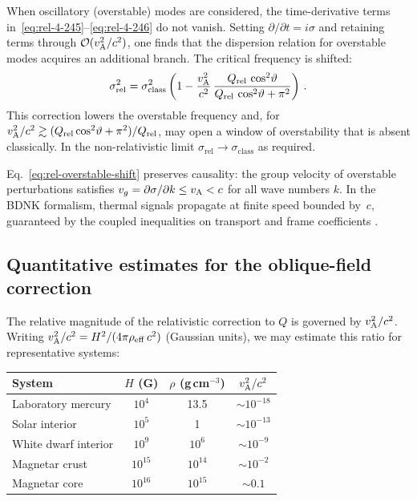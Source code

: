 When oscillatory (overstable) modes are considered, the time-derivative
terms in~\eqref{eq:rel-4-245}--\eqref{eq:rel-4-246} do not vanish.
Setting $\partial/\partial t = i\sigma$ and retaining terms through
$\mathcal{O}(v_{\mathrm{A}}^{2}/c^{2})$, one finds that the dispersion relation for
overstable modes acquires an additional branch.  The critical frequency
is shifted:
\begin{equation}
  \sigma_{\mathrm{rel}}^{2}
  = \sigma_{\mathrm{class}}^{2}
    \left(1 - \frac{v_{\mathrm{A}}^{2}}{c^{2}}\,
              \frac{Q_{\mathrm{rel}}\,\cos^{2}\!\vartheta}
                   {Q_{\mathrm{rel}}\,\cos^{2}\!\vartheta + \pi^{2}}\right)\,.
  \label{eq:rel-overstable-shift}
\end{equation}
This correction lowers the overstable frequency and, for
$v_{\mathrm{A}}^{2}/c^{2} \gtrsim (Q_{\mathrm{rel}}\cos^{2}\!\vartheta + \pi^{2})/Q_{\mathrm{rel}}$,
may open a window of overstability that is absent classically.  In the
non-relativistic limit $\sigma_{\mathrm{rel}}\to\sigma_{\mathrm{class}}$
as required.

\begin{causalitycheck}
Eq.~\eqref{eq:rel-overstable-shift} preserves causality: the group
velocity of overstable perturbations satisfies
$v_{g} = \partial\sigma/\partial k \leq v_{\mathrm{A}} < c$ for all wave numbers
$k$.  In the BDNK formalism, thermal signals propagate at finite speed
bounded by~$c$, guaranteed by the coupled inequalities on transport
and frame coefficients \citep{BemficaDN2018,Kovtun2019}.
\end{causalitycheck}

\subsection{Quantitative estimates for the oblique-field correction}
\label{subsec:rel-47-estimates}

The relative magnitude of the relativistic correction to $Q$ is
governed by $v_{\mathrm{A}}^{2}/c^{2}$.  Writing $v_{\mathrm{A}}^{2}/c^{2} = H^{2}/
(4\pi\rho_{\mathrm{eff}}\,c^{2})$ (Gaussian units), we may estimate this ratio for
representative systems:

\begin{center}
\begin{tabular}{lccc}
\hline
System & $H$ (G) & $\rho$ (g\,cm$^{-3}$) & $v_{\mathrm{A}}^{2}/c^{2}$ \\
\hline
Laboratory mercury    & $10^{4}$    & 13.5    & $\sim 10^{-18}$ \\
Solar interior        & $10^{5}$    & 1       & $\sim 10^{-13}$ \\
White dwarf interior  & $10^{9}$    & $10^{6}$& $\sim 10^{-9}$  \\
Magnetar crust        & $10^{15}$   & $10^{14}$& $\sim 10^{-2}$ \\
Magnetar core         & $10^{16}$   & $10^{15}$& $\sim 0.1$     \\
\hline
\end{tabular}
\end{center}

